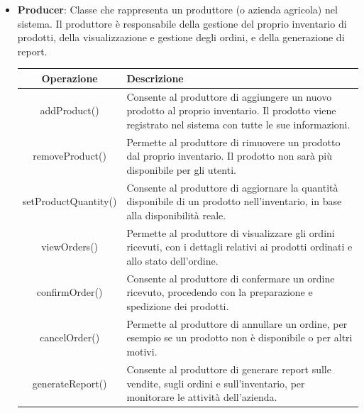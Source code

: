 \begin{itemize}
\item \textbf{Producer}:
Classe che rappresenta un produttore (o azienda agricola) nel sistema. Il produttore è responsabile della gestione del proprio inventario di prodotti, della visualizzazione e gestione degli ordini, e della generazione di report.
\begin{table}[!htbp]
    \centering
    \begin{tabularx}{\textwidth}{| c | X |}
    \hline
         \textbf{Operazione} & \textbf{Descrizione} \\
         \hline
         addProduct() & Consente al produttore di aggiungere un nuovo prodotto al proprio inventario. Il prodotto viene registrato nel sistema con tutte le sue informazioni. \\
         \hline
         removeProduct() & Permette al produttore di rimuovere un prodotto dal proprio inventario. Il prodotto non sarà più disponibile per gli utenti. \\
         \hline
         setProductQuantity() & Consente al produttore di aggiornare la quantità disponibile di un prodotto nell'inventario, in base alla disponibilità reale. \\
         \hline
         viewOrders() & Permette al produttore di visualizzare gli ordini ricevuti, con i dettagli relativi ai prodotti ordinati e allo stato dell'ordine. \\
         \hline
         confirmOrder() & Consente al produttore di confermare un ordine ricevuto, procedendo con la preparazione e spedizione dei prodotti. \\
         \hline
         cancelOrder() & Permette al produttore di annullare un ordine, per esempio se un prodotto non è disponibile o per altri motivi. \\
         \hline
         generateReport() & Consente al produttore di generare report sulle vendite, sugli ordini e sull'inventario, per monitorare le attività dell'azienda. \\
         \hline
    \end{tabularx}
\end{table}

\end{itemize}


